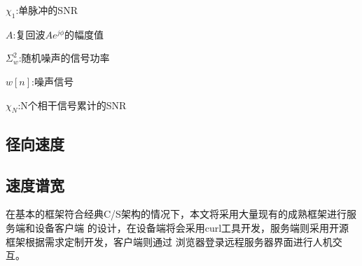 \documentclass[a4paper,12pt]{report}
\begin{document}
\begin{spacing}{1.5}
\begin{proposition}[相干积累]
    $\chi_1$:单脉冲的SNR

    $A$:复回波$Ae^{j\phi}$的幅度值

    $\Sigma_w^2$:随机噪声的信号功率

    $w[n]$:噪声信号

    $\chi_N$:N个相干信号累计的SNR

\end{proposition}


\subsection{径向速度}

\subsection{速度谱宽}



在基本的框架符合经典C/S架构的情况下，本文将采用大量现有的成熟框架进行服务端和设备客户端
的设计，在设备端将会采用curl工具开发，服务端则采用开源框架根据需求定制开发，客户端则通过
浏览器登录远程服务器界面进行人机交互。

\end{spacing}

\end{document}
